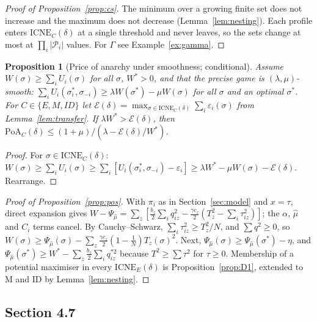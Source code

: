 \documentclass[preprint,12pt]{elsarticle}
\newtheorem{proposition}[theorem]{Proposition}
\theoremstyle{definition}
\theoremstyle{remark}
\newcommand{\cP}{\mathcal{P}}
\newcommand{\ICNE}{\mathrm{ICNE}}
\begin{document}
\begin{proof}[Proof of Proposition~\ref{prop:cs}]
The minimum over a growing finite set does not increase and the maximum does not decrease (Lemma~\ref{lem:nesting}). Each profile enters $\ICNE_C(\delta)$ at a single threshold and never leaves, so the sets change at most at $\prod_i|\cP_i|$ values. For $\Gamma$ see Example~\ref{ex:gamma}.
\end{proof}

\begin{proposition}[Price of anarchy under smoothness; conditional]\label{prop:smooth}
Assume $W(\sigma)\ge\sum_iU_i(\sigma)$ for all $\sigma$, $W^*>0$, and that the precise game is $(\lambda,\mu)$-smooth: $\sum_iU_i(\sigma^*_i,\sigma_{-i})\ge\lambda W(\sigma^*)-\mu W(\sigma)$ for all $\sigma$ and an optimal $\sigma^*$. For $C\in\{E,M,ID\}$ let $\mathcal E(\delta)=\max_{\sigma\in\ICNE_C(\delta)}\sum_i\varepsilon_i(\sigma)$ from Lemma~\ref{lem:transfer}. If $\lambda W^*>\mathcal E(\delta)$, then $\mathrm{PoA}_C(\delta)\le(1+\mu)/(\lambda-\mathcal E(\delta)/W^*)$.
\end{proposition}
\begin{proof}
For $\sigma\in\ICNE_C(\delta)$: $W(\sigma)\ge\sum_iU_i(\sigma)\ge\sum_i[U_i(\sigma^*_i,\sigma_{-i})-\varepsilon_i]\ge\lambda W^*-\mu W(\sigma)-\mathcal E(\delta)$. Rearrange.
\end{proof}

\begin{proof}[Proof of Proposition~\ref{prop:pos}]
With $\pi_i$ as in Section~\ref{sec:model} and $x=\tau$, direct expansion gives $W-\Psi_{\hat\mu}=\sum_z[\tfrac{b_z}{2}\sum_iq_{iz}^2-\tfrac{\gamma c_z}{2}(T_z^2-\sum_i\tau_{iz}^2)]$; the $\alpha$, $\hat\mu$ and $C_i$ terms cancel. By Cauchy--Schwarz, $\sum_i\tau_{iz}^2\ge T_z^2/N$, and $\sum q^2\ge0$, so $W(\sigma)\ge\Psi_{\hat\mu}(\sigma)-\sum_z\tfrac{\gamma c_z}{2}(1-\tfrac1N)T_z(\sigma)^2$. Next, $\Psi_{\hat\mu}(\sigma)\ge\Psi_{\hat\mu}(\sigma^*)-\eta$, and $\Psi_{\hat\mu}(\sigma^*)\ge W^*-\sum_z\tfrac{b_z}{2}\sum_iq_{iz}^{*2}$ because $T^2\ge\sum\tau^2$ for $\tau\ge0$. Membership of a potential maximiser in every $\ICNE_E(\delta)$ is Proposition~\ref{prop:D1}, extended to M and ID by Lemma~\ref{lem:nesting}.
\end{proof}

\subsection{Section 4.7}
\end{document}
